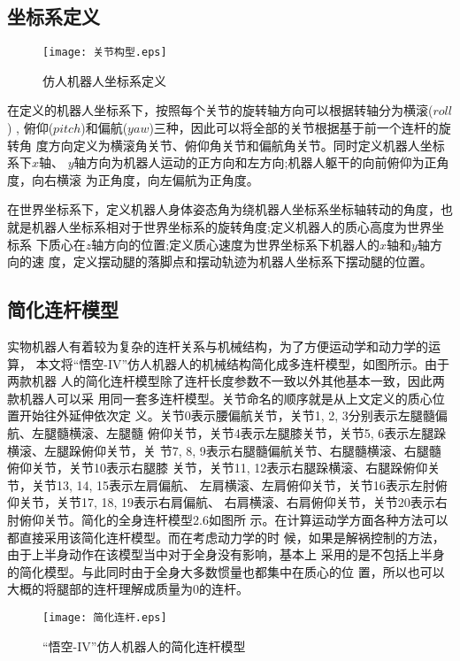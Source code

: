 \subsection{坐标系定义}
\begin{figure}[htbp]
    \centering
    \texttt{[image: 关节构型.eps]}
    \caption{\label{fig:coordination}仿人机器人坐标系定义}
\end{figure}
在定义的机器人坐标系下，按照每个关节的旋转轴方向可以根据转轴分为横滚($roll$) ,
俯仰($pitch$)和偏航($yaw$)三种，因此可以将全部的关节根据基于前一个连杆的旋转角
度方向定义为横滚角关节、俯仰角关节和偏航角关节。同时定义机器人坐标系下$x$轴、
$y$轴方向为机器人运动的正方向和左方向;机器人躯干的向前俯仰为正角度，向右横滚
为正角度，向左偏航为正角度。

在世界坐标系下，定义机器人身体姿态角为绕机器人坐标系坐标轴转动的角度，也
就是机器人坐标系相对于世界坐标系的旋转角度;定义机器人的质心高度为世界坐标系
下质心在$z$轴方向的位置;定义质心速度为世界坐标系下机器人的$x$轴和$y$轴方向的速
度，定义摆动腿的落脚点和摆动轨迹为机器人坐标系下摆动腿的位置。
\subsection{简化连杆模型}

实物机器人有着较为复杂的连杆关系与机械结构，为了方便运动学和动力学的运算，
本文将“悟空-IV”仿人机器人的机械结构简化成多连杆模型，如图所示。由于两款机器
人的简化连杆模型除了连杆长度参数不一致以外其他基本一致，因此两款机器人可以采
用同一套多连杆模型。关节命名的顺序就是从上文定义的质心位置开始往外延伸依次定
义。关节0表示腰偏航关节，关节1, 2, 3分别表示左腿髓偏航、左腿髓横滚、左腿髓
俯仰关节，关节4表示左腿膝关节，关节5, 6表示左腿跺横滚、左腿跺俯仰关节，关
节7,  8,   9表示右腿髓偏航关节、右腿髓横滚、右腿髓俯仰关节，关节10表示右腿膝
关节，关节11, 12表示右腿跺横滚、右腿跺俯仰关节，关节13, 14, 15表示左肩偏航、
左肩横滚、左肩俯仰关节，关节16表示左肘俯仰关节，关节17, 18, 19表示右肩偏航、
右肩横滚、右肩俯仰关节，关节20表示右肘俯仰关节。简化的全身连杆模型2.6如图所
示。在计算运动学方面各种方法可以都直接采用该简化连杆模型。而在考虑动力学的时
候，如果是解祸控制的方法，由于上半身动作在该模型当中对于全身没有影响，基本上
采用的是不包括上半身的简化模型。与此同时由于全身大多数惯量也都集中在质心的位
置，所以也可以大概的将腿部的连杆理解成质量为0的连杆。

\begin{figure}[htbp]
    \centering
    \texttt{[image: 简化连杆.eps]}
    \caption{\label{fig:link_model}“悟空-IV”仿人机器人的简化连杆模型}
\end{figure}

